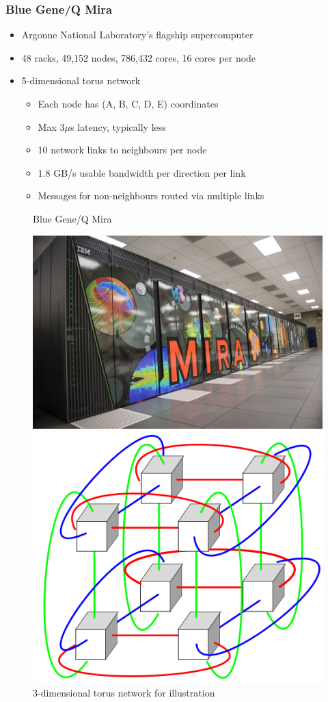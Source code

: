 \documentclass{beamer}
\begin{document}
\begin{frame}
\frametitle{Blue Gene/Q Mira}
\begin{itemize}
\item Argonne National Laboratory's flagship supercomputer
\item 48 racks, 49,152 nodes, 786,432 cores, 16 cores per node
\item 5-dimensional torus network
  \begin{itemize}
    \item Each node has (A, B, C, D, E) coordinates
    \item Max 3$\mu$s latency, typically less
    \item 10 network links to neighbours per node
    \item 1.8 GB/s usable bandwidth per direction per link
    \item Messages for non-neighbours routed via multiple links
  \end{itemize}
\end{itemize}
\vspace{-1.0em}
\centering
\begin{figure}
  \begin{minipage}{0.45\textwidth}
    \centering
    \caption{Blue Gene/Q Mira}
    \includegraphics[width=0.9\linewidth]{mira}
  \end{minipage}
  \begin{minipage}{0.45\textwidth}
    \centering
    \caption{3-dimensional torus network for illustration}
    \includegraphics[width=0.65\linewidth]{500px-2x2x2torus}
  \end{minipage}
\end{figure}
\end{frame}
\end{document}
